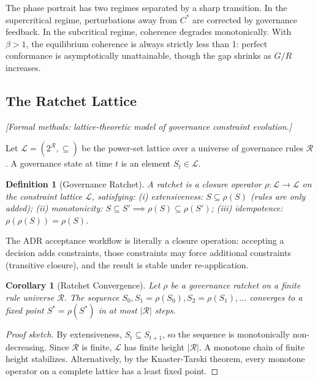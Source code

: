 \documentclass[11pt, a4paper]{googledeepmind}
\newtheorem{definition}{Definition}[section]
\newtheorem{corollary}{Corollary}[section]
\begin{document}
The phase portrait has two regimes separated by a sharp transition. In the supercritical regime, perturbations away from $C^*$ are corrected by governance feedback. In the subcritical regime, coherence degrades monotonically. With $\beta > 1$, the equilibrium coherence is always strictly less than 1: perfect conformance is asymptotically unattainable, though the gap shrinks as $G/R$ increases.

\subsection{The Ratchet Lattice}
\emph{[Formal methods: lattice-theoretic model of governance constraint evolution.]}

Let $\mathcal{L} = (2^{\mathcal{R}}, \subseteq)$ be the power-set lattice over a universe of governance rules $\mathcal{R}$. A governance state at time $t$ is an element $S_t \in \mathcal{L}$.

\begin{definition}[Governance Ratchet]
\label{def:ratchet}
A ratchet is a closure operator $\rho: \mathcal{L} \to \mathcal{L}$ on the constraint lattice $\mathcal{L}$, satisfying: (i) extensiveness: $S \subseteq \rho(S)$ (rules are only added); (ii) monotonicity: $S \subseteq S' \implies \rho(S) \subseteq \rho(S')$; (iii) idempotence: $\rho(\rho(S)) = \rho(S)$.
\end{definition}

The ADR acceptance workflow is literally a closure operation: accepting a decision adds constraints, those constraints may force additional constraints (transitive closure), and the result is stable under re-application.

\begin{corollary}[Ratchet Convergence]
\label{thm:ratchet-convergence}
Let $\rho$ be a governance ratchet on a finite rule universe $\mathcal{R}$. The sequence $S_0, S_1 = \rho(S_0), S_2 = \rho(S_1), \ldots$ converges to a fixed point $S^* = \rho(S^*)$ in at most $|\mathcal{R}|$ steps.
\end{corollary}

\begin{proof}[Proof sketch]
By extensiveness, $S_t \subseteq S_{t+1}$, so the sequence is monotonically non-decreasing. Since $\mathcal{R}$ is finite, $\mathcal{L}$ has finite height $|\mathcal{R}|$. A monotone chain of finite height stabilizes. Alternatively, by the Knaster-Tarski theorem, every monotone operator on a complete lattice has a least fixed point.
\end{proof}
\end{document}
